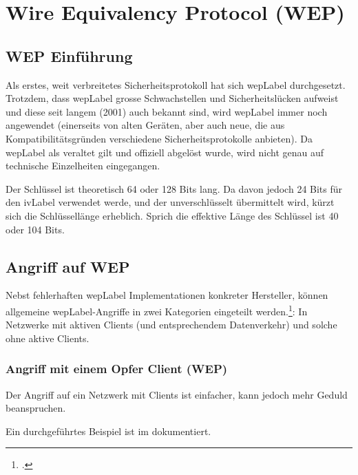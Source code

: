 \chapter{Wire Equivalency Protocol (WEP)}
\label{ch:wep}

\section{WEP Einführung}
Als erstes, weit verbreitetes Sicherheitsprotokoll hat sich \acrfull{wepLabel} durchgesetzt.
Trotzdem, dass \gls{wepLabel} grosse Schwachstellen und Sicherheitslücken aufweist und diese seit langem (2001) auch bekannt sind, wird \gls{wepLabel} immer noch angewendet (einerseits von alten Geräten, aber auch neue, die aus Kompatibilitätsgründen verschiedene Sicherheitsprotokolle anbieten).
Da \gls{wepLabel} als veraltet gilt und offiziell abgelöst wurde, wird nicht genau auf technische Einzelheiten eingegangen.

Der Schlüssel ist theoretisch 64 oder 128 Bits lang.
Da davon jedoch 24 Bits für den \gls{ivLabel} verwendet werde, und der unverschlüsselt übermittelt wird, kürzt sich die Schlüssellänge erheblich.
Sprich die effektive Länge des Schlüssel ist 40 oder 104 Bits.

\section{Angriff auf WEP}
Nebst fehlerhaften \gls{wepLabel} Implementationen konkreter Hersteller, können allgemeine \gls{wepLabel}-Angriffe in zwei Kategorien eingeteilt werden.\footcite[][126f.]{WrightCache201503}:
In Netzwerke mit aktiven Clients (und entsprechendem Datenverkehr) und solche ohne aktive Clients.

\subsection{Angriff mit einem Opfer Client (WEP)}
Der Angriff auf ein Netzwerk mit Clients ist einfacher, kann jedoch mehr Geduld beanspruchen.

Ein durchgeführtes Beispiel ist im  dokumentiert.


